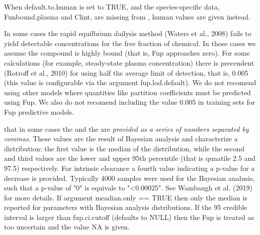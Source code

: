 \documentclass[a4paper]{book}
\begin{document}
%
\begin{Details}\relax
When default.to.human is set to TRUE, and the species-specific data,
Funbound.plasma and Clint, are missing from 
, human values are given instead.

In some cases the rapid equilbrium dailysis method (Waters et al., 2008)
fails to yield detectable concentrations for the free fraction of chemical. 
In those cases we assume the compound is highly bound (that is, Fup approaches
zero). For some calculations (for example, steady-state plasma concentration)
there is precendent (Rotroff et al., 2010) for using half the average limit 
of detection, that is, 0.005 (this value is configurable via the argument
fup.lod.default). We do not recomend using other models where 
quantities like partition coefficients must be predicted using Fup. We also
do not recomend including the value 0.005 in training sets for Fup predictive
models.

 that in some cases the  and the 
 are
\emph{provided as a series of numbers separated by commas}. These values are the 
result of Bayesian analysis and characterize a distribution: the first value
is the median of the distribution, while the second and third values are the 
lower and upper 95th percentile (that is qunatile 2.5 and 97.5) respectively.
For intrinsic clearance a fourth value indicating a p-value for a decrease is
provided. Typically 4000 samples were used for the Bayesian analusis, such
that a p-value of "0" is equivale to "<0.00025". See Wambaugh et al. (2019)
for more details. If argument meadian.only == TRUE then only the median is
reported for parameters with Bayesian analysis distributions. If the 95
credible interval is larger than fup.ci.cutoff (defaults
to NULL) then the Fup is treated as too uncertain and the value NA is given.
\end{Details}
%
\end{document}
